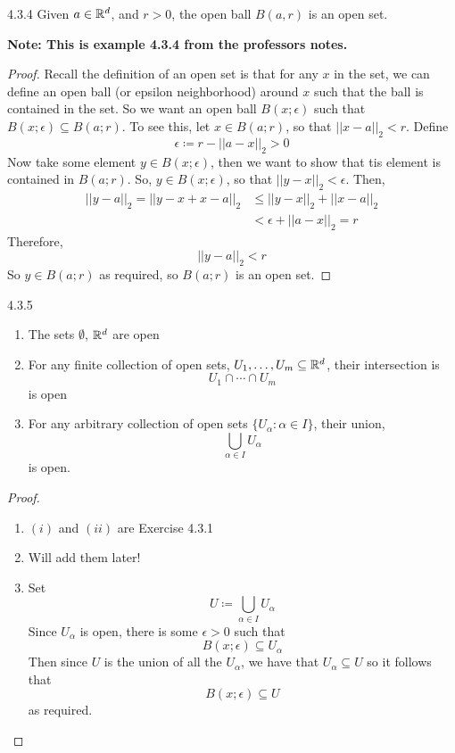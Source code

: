 \documentclass[openany]{report}
\begin{document}
\begin{manualprop}{4.3.4}
    Given $a \in \mathbb{R}^d$, and $r > 0$, the open ball $B(a,r)$ is an open set. 
\end{manualprop}
\begin{center}
    \textbf{Note: This is example 4.3.4 from the professors notes.}
\end{center}
\begin{proof}
    Recall the definition of an open set is that for any $x$ in the set, we can define an open ball (or epsilon neighborhood) around $x$ such that the ball is contained in the set. So we want an open ball $B(x;\epsilon)$ such that $B(x;\epsilon) \subseteq B(a;r)$. To see this, let $x \in B(a;r)$, so that $||x-a||_2 < r$. Define 
    \[\epsilon \coloneqq r - ||a-x||_2 > 0\] 
    Now take some element $y \in B(x;\epsilon)$, then we want to show that tis element is contained in $B(a;r)$. So, $y \in B(x;\epsilon)$, so that $||y-x||_2 < \epsilon$. Then,
    \begin{align*}
        ||y-a||_2 = ||y - x + x -a||_2 &\leq ||y - x||_2 + ||x -a||_2\\
        &< \epsilon + ||a-x||_2 = r
    \end{align*}
    Therefore, 
    \[||y-a||_2 < r\]
    So $y \in B(a;r)$ as required, so $B(a;r)$ is an open set.
\end{proof}


\begin{manualprop}{4.3.5}
    \begin{enumerate}[label=(\roman*)]
        \item The sets $\emptyset$, $\mathbb{R}^d$ are open
        \item For any finite collection of open sets, $U_1, \ldots, U_m \subseteq \mathbb{R}^d$, their intersection is
        \[U_1 \cap \cdots \cap U_m\]
        is open
        \item For any arbitrary collection of open sets $\{U_\alpha: \alpha \in I\}$, their union,
        \[\bigcup_{\alpha\in I} U_\alpha\]
        is open.
    \end{enumerate}
\end{manualprop}
\begin{proof}
    \begin{enumerate}[label=(\roman*)]
        \item $(i)$ and $(ii)$ are Exercise 4.3.1
        \item Will add them later!
        \item Set
        \[U \coloneqq \bigcup_{\alpha\in I} U_\alpha\]
        Since $U_\alpha$ is open, there is some $\epsilon > 0$ such that 
        \[B(x;\epsilon) \subseteq U_\alpha\]
        Then since $U$ is the union of all the $U_\alpha$, we have that $U_\alpha \subseteq U$ so it follows that 
        \[B(x;\epsilon) \subseteq U\]
        as required. 
    \end{enumerate}
\end{proof}
\end{document}
